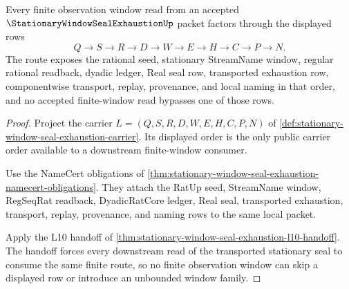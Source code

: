 \begin{theorem}
\label{thm:stationary-window-seal-exhaustion-finite-window-route}
Every finite observation window read from an accepted $\StationaryWindowSealExhaustionUp$ packet factors through the displayed rows
$$
Q\longrightarrow S\longrightarrow R\longrightarrow D\longrightarrow W\longrightarrow E\longrightarrow H\longrightarrow C\longrightarrow P\longrightarrow N .
$$
The route exposes the rational seed, stationary StreamName window, regular rational readback, dyadic ledger, Real seal row, transported exhaustion row, componentwise transport, replay, provenance, and local naming in that order, and no accepted finite-window read bypasses one of those rows.
\end{theorem}
\begin{proof}
Project the carrier $L=(Q,S,R,D,W,E,H,C,P,N)$ of \autoref{def:stationary-window-seal-exhaustion-carrier}. Its displayed order is the only public carrier order available to a downstream finite-window consumer.

Use the NameCert obligations of \autoref{thm:stationary-window-seal-exhaustion-namecert-obligations}. They attach the RatUp seed, StreamName window, RegSeqRat readback, DyadicRatCore ledger, Real seal, transported exhaustion, transport, replay, provenance, and naming rows to the same local packet.

Apply the L10 handoff of \autoref{thm:stationary-window-seal-exhaustion-l10-handoff}. The handoff forces every downstream read of the transported stationary seal to consume the same finite route, so no finite observation window can skip a displayed row or introduce an unbounded window family.
\end{proof}


